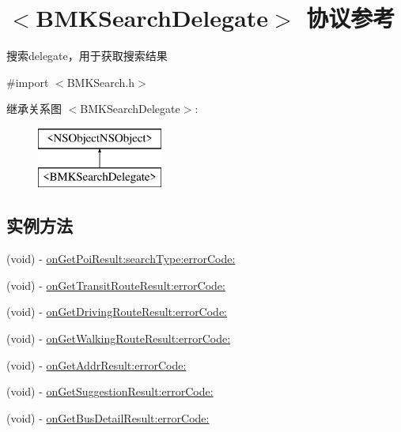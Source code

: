 \hypertarget{protocol_b_m_k_search_delegate-p}{\section{$<$B\-M\-K\-Search\-Delegate$>$ 协议参考}
\label{protocol_b_m_k_search_delegate-p}
}


搜索delegate，用于获取搜索结果  




{\ttfamily \#import $<$B\-M\-K\-Search.\-h$>$}

继承关系图 $<$B\-M\-K\-Search\-Delegate$>$\-:\begin{figure}[H]
\begin{center}
\leavevmode
\includegraphics[height=2.000000cm]{protocol_b_m_k_search_delegate-p}
\end{center}
\end{figure}
\subsection*{实例方法}
\begin{DoxyCompactItemize}
\item 
(void) -\/ \hyperlink{protocol_b_m_k_search_delegate-p_aaebc1737d2df985b3d7878fd9ea53122}{on\-Get\-Poi\-Result\-:search\-Type\-:error\-Code\-:}
\item 
(void) -\/ \hyperlink{protocol_b_m_k_search_delegate-p_a300f82b22ee2295fb1eda590ce468f6e}{on\-Get\-Transit\-Route\-Result\-:error\-Code\-:}
\item 
(void) -\/ \hyperlink{protocol_b_m_k_search_delegate-p_ae37ff980770f8d8b1129e41cc05c76ae}{on\-Get\-Driving\-Route\-Result\-:error\-Code\-:}
\item 
(void) -\/ \hyperlink{protocol_b_m_k_search_delegate-p_a4fcbf962b5af9d50c194a69da26261c1}{on\-Get\-Walking\-Route\-Result\-:error\-Code\-:}
\item 
(void) -\/ \hyperlink{protocol_b_m_k_search_delegate-p_a7eebe5b2da7524f72e9f56413647d2fc}{on\-Get\-Addr\-Result\-:error\-Code\-:}
\item 
(void) -\/ \hyperlink{protocol_b_m_k_search_delegate-p_a029cc846020073395c4c437798ccfa05}{on\-Get\-Suggestion\-Result\-:error\-Code\-:}
\item 
(void) -\/ \hyperlink{protocol_b_m_k_search_delegate-p_aa43e8862315533032603901acaaf8dca}{on\-Get\-Bus\-Detail\-Result\-:error\-Code\-:}
\end{DoxyCompactItemize}


